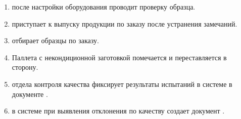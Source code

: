 \begin{enumerate}


 \item \operator после настройки оборудования проводит проверку образца.
 \item \operator приступает к выпуску продукции по заказу после устранения замечаний.
 
\item \laborant отбирает образцы по заказу.
\item Паллета  с некондиционной заготовкой помечается и переставляется в сторону.
\item \laborant отдела контроля качества фиксирует результаты испытаний в системе \gofro  в документе .
\item \operator в системе \gofro при выявления отклонения по качеству создает документ .

\end{enumerate}